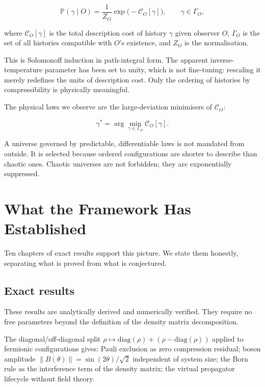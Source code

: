 \begin{equation}
\mathbb{P}(\gamma \mid O)
= \frac{1}{Z_O}\exp\!\bigl(-\mathcal{C}_O[\gamma]\bigr),
\qquad \gamma \in \Gamma_O,
\label{eq:master}
\end{equation}

where $\mathcal{C}_O[\gamma]$ is the total description cost of history
$\gamma$ given observer $O$, $\Gamma_O$ is the set of all histories
compatible with $O$'s existence, and $Z_O$ is the normalisation.

This is Solomonoff induction in path-integral form. The apparent
inverse-temperature parameter has been set to unity, which is not
fine-tuning: rescaling it merely redefines the units of description
cost. Only the ordering of histories by compressibility is physically
meaningful.

The physical laws we observe are the large-deviation minimisers of
$\mathcal{C}_O$:

\[
\gamma^* = \arg\min_{\gamma \in \Gamma_O} \mathcal{C}_O[\gamma].
\]

A universe governed by predictable, differentiable laws is not
mandated from outside. It is selected because ordered configurations
are shorter to describe than chaotic ones. Chaotic universes are not
forbidden; they are exponentially suppressed.

\section{What the Framework Has Established}

Ten chapters of exact results support this picture. We state them
honestly, separating what is proved from what is conjectured.

\subsection*{Exact results}

These results are analytically derived and numerically verified. They
require no free parameters beyond the definition of the density matrix
decomposition.

The diagonal/off-diagonal split $\rho \mapsto \mathrm{diag}(\rho) +
(\rho - \mathrm{diag}(\rho))$ applied to fermionic configurations
gives: Pauli exclusion as zero compression residual; boson amplitude
$\|B(\theta)\| = \sin(2\theta)/\sqrt{2}$ independent of system size;
the Born rule as the interference term of the density matrix; the
virtual propagator lifecycle without field theory.

